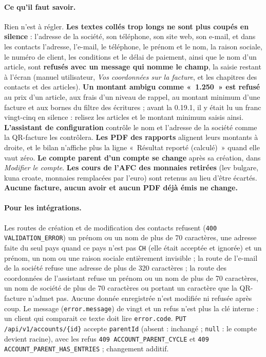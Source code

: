 \documentclass[a4paper,11pt,oneside]{article}
\begin{document}
\paragraph{Ce qu'il faut savoir.} Rien n'est à régler. \textbf{Les textes collés trop longs ne sont plus coupés en silence} : l'adresse de la société, son téléphone, son site web, son e-mail, et dans les contacts l'adresse, l'e-mail, le téléphone, le prénom et le nom, la raison sociale, le numéro de client, les conditions et le délai de paiement, ainsi que le nom d'un article, sont \textbf{refusés avec un message qui nomme le champ}, la saisie restant à l'écran (manuel utilisateur, \emph{Vos coordonnées sur la facture}, et les chapitres des contacts et des articles). \textbf{Un montant ambigu comme «~1.250~» est refusé} au prix d'un article, aux frais d'un niveau de rappel, au montant minimum d'une facture et aux bornes du filtre des écritures ; avant la 0.19.1, il y était lu un franc vingt-cinq en silence : relisez les articles et le montant minimum saisis ainsi. \textbf{L'assistant de configuration} contrôle le nom et l'adresse de la société comme la QR-facture les contrôlera. \textbf{Les PDF des rapports} alignent leurs montants à droite, et le bilan n'affiche plus la ligne «~Résultat reporté (calculé)~» quand elle vaut zéro. \textbf{Le compte parent d'un compte se change} après sa création, dans \emph{Modifier le compte}. \textbf{Les cours de l'AFC des monnaies retirées} (lev bulgare, kuna croate, monnaies remplacées par l'euro) sont retenus au lieu d'être écartés. \textbf{Aucune facture, aucun avoir et aucun PDF déjà émis ne change.}

\begin{sloppypar}
\paragraph{Pour les intégrations.} Les routes de création et de modification des contacts refusent (\texttt{400 VALIDATION\_ERROR}) un prénom ou un nom de plus de 70 caractères, une adresse faite du seul pays quand ce pays n'est pas \texttt{CH} (elle était acceptée et ignorée) et un prénom, un nom ou une raison sociale entièrement invisible ; la route de l'e-mail de la société refuse une adresse de plus de 320 caractères ; la route des coordonnées de l'assistant refuse un prénom ou un nom de plus de 70 caractères, un nom de société de plus de 70 caractères ou portant un caractère que la QR-facture n'admet pas. Aucune donnée enregistrée n'est modifiée ni refusée après coup. Le message (\texttt{error.message}) de vingt et un refus n'est plus la clé interne : un client qui comparait ce texte doit lire \texttt{error.code}. \texttt{PUT /api/v1/accounts/\allowbreak\{id\}} accepte \texttt{parentId} (absent : inchangé ; \texttt{null} : le compte devient racine), avec les refus \texttt{409 ACCOUNT\_PARENT\_CYCLE} et \texttt{409 ACCOUNT\_PARENT\_HAS\_ENTRIES} ; changement additif.
\end{sloppypar}
\end{document}
